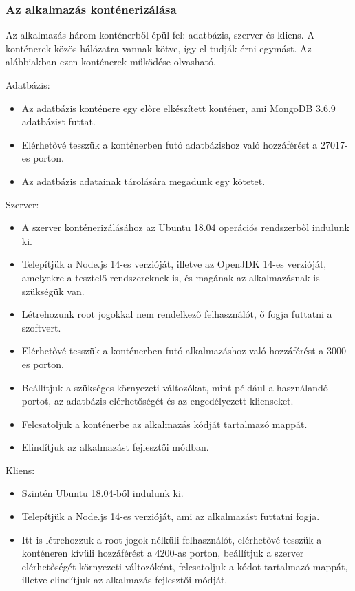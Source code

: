 \documentclass{elteikthesis}
\begin{document}
				\subsubsection{Az alkalmazás konténerizálása}
					Az alkalmazás három konténerből épül fel: adatbázis, szerver és kliens. A konténerek közös hálózatra vannak kötve, így el tudják érni egymást. Az alábbiakban ezen konténerek működése olvasható.

					Adatbázis:
					\begin{itemize}
						\setlength\itemsep{-0.5em}
						\item Az adatbázis konténere egy előre elkészített konténer, ami MongoDB 3.6.9 adatbázist futtat.
						\item Elérhetővé tesszük a konténerben futó adatbázishoz való hozzáférést a 27017-es porton.
						\item Az adatbázis adatainak tárolására megadunk egy kötetet.
					\end{itemize}

					Szerver:
					\begin{itemize}
						\setlength\itemsep{-0.5em}
						\item A szerver konténerizálásához az Ubuntu 18.04 operációs rendszerből indulunk ki.
						\item Telepítjük a Node.js 14-es verzióját, illetve az OpenJDK 14-es verzióját, amelyekre a tesztelő rendszereknek is, és magának az alkalmazásnak is szükségük van.
						\item Létrehozunk root jogokkal nem rendelkező felhasználót, ő fogja futtatni a szoftvert.
						\item Elérhetővé tesszük a konténerben futó alkalmazáshoz való hozzáférést a 3000-es porton.
						\item Beállítjuk a szükséges környezeti változókat, mint például a használandó portot, az adatbázis elérhetőségét és az engedélyezett klienseket.
						\item Felcsatoljuk a konténerbe az alkalmazás kódját tartalmazó mappát.
						\item Elindítjuk az alkalmazást fejlesztői módban.
					\end{itemize}

					Kliens:
					\begin{itemize}
						\setlength\itemsep{-0.5em}
						\item Szintén Ubuntu 18.04-ből indulunk ki.
						\item Telepítjük a Node.js 14-es verzióját, ami az alkalmazást futtatni fogja.
						\item Itt is létrehozzuk a root jogok nélküli felhasználót, elérhetővé tesszük a konténeren kívüli hozzáférést a 4200-as porton, beállítjuk a szerver elérhetőségét környezeti változóként, felcsatoljuk a kódot tartalmazó mappát, illetve elindítjuk az alkalmazás fejlesztői módját.
					\end{itemize}
\end{document}
